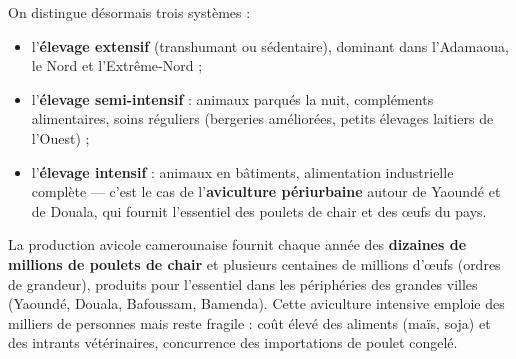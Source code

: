\documentclass[11pt]{article}
\begin{document}
On distingue désormais trois systèmes :

\begin{itemize}
\item l'\textbf{élevage extensif} (transhumant ou sédentaire), dominant dans l'Adamaoua, le Nord et l'Extrême-Nord ;
\item l'\textbf{élevage semi-intensif} : animaux parqués la nuit, compléments alimentaires, soins réguliers (bergeries améliorées, petits élevages laitiers de l'Ouest) ;
\item l'\textbf{élevage intensif} : animaux en bâtiments, alimentation industrielle complète — c'est le cas de l'\textbf{aviculture périurbaine} autour de Yaoundé et de Douala, qui fournit l'essentiel des poulets de chair et des œufs du pays.
\end{itemize}

\begin{exemplebox}
La production avicole camerounaise fournit chaque année des \textbf{dizaines de millions de poulets de chair} et plusieurs centaines de millions d'œufs (ordres de grandeur), produits pour l'essentiel dans les périphéries des grandes villes (Yaoundé, Douala, Bafoussam, Bamenda). Cette aviculture intensive emploie des milliers de personnes mais reste fragile : coût élevé des aliments (maïs, soja) et des intrants vétérinaires, concurrence des importations de poulet congelé.
\end{exemplebox}
\end{document}
